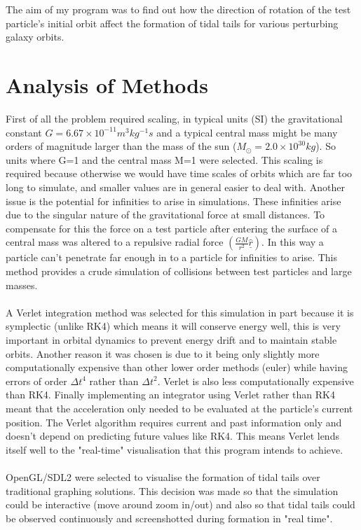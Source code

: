 \documentclass[10pt,a4paper]{article}
\begin{document}
\\
\\
The aim of my program was to find out how the direction of rotation of the test particle's initial orbit affect the formation of tidal tails for various perturbing galaxy orbits.

\clearpage
\section{Analysis of Methods}
First of all the problem required scaling, in typical units (SI) the gravitational constant $G=6.67\times10^{-11} m^3 kg^{-1} s$ and a typical central mass might be many orders of magnitude larger than the mass of the sun ($M_\odot=2.0\times10^{30 } kg$). So units where G=1 and the central mass M=1 were selected. This scaling is required because otherwise we would have time scales of orbits which are far too long to simulate, and smaller values are in general easier to deal with. Another issue is the potential for infinities to arise in simulations. These infinities arise due to the singular nature of the gravitational force at small distances. To compensate for this the force on a test particle after entering the surface of a central mass was altered to a repulsive radial force $(\frac{GM}{r^2} \underline{\hat{r}})$. In this way a particle can't penetrate far enough in to a particle for infinities to arise. This method provides a crude simulation of collisions between test particles and large masses.
\\
\\
A Verlet integration method was selected for this simulation in part because it is symplectic (unlike RK4) which means it will conserve energy well, this is very important in orbital dynamics to prevent energy drift and to maintain stable orbits. Another reason it was chosen is due to it being only slightly more computationally expensive than other lower order methods (euler) while having errors of order $\Delta t^4$ rather than $\Delta t^2$. Verlet is also less computationally expensive than RK4. Finally implementing an integrator using Verlet rather than RK4 meant that the acceleration only needed to be evaluated at the particle's current position. The Verlet algorithm requires current and past information only and doesn't depend on predicting future values like RK4. This means Verlet lends itself well to the "real-time" visualisation that this program intends to achieve.
\\
\\
OpenGL/SDL2 were selected to visualise the formation of tidal tails over traditional graphing solutions. This decision was made so that the simulation could be interactive (move around zoom in/out) and also so that tidal tails could be observed continuously and screenshotted during formation in "real time".
\end{document}
